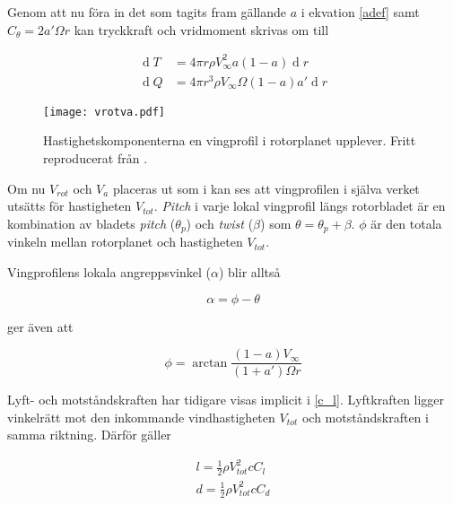 Genom att nu föra in det som tagits fram gällande $a$ i ekvation \ref{adef} samt $C_{\theta} = 2 a' \Omega r$ kan tryckkraft och vridmoment skrivas om till

\begin{equations}
\begin{align}
\label{firstdT}\operatorname{d}\!T &= 4 \pi r \rho V_{\infty}^2 a (1 - a) \operatorname{d}\!r \\
\label{firstdQ}\operatorname{d}\!Q &= 4 \pi r^3 \rho V_{\infty} \Omega (1 - a) a' \operatorname{d}\!r 
\end{align}
\end{equations}

\begin{figure}[!htb]
  \centering
  \texttt{[image: vrotva.pdf]}
  \caption{Hastighetskomponenterna en vingprofil i rotorplanet upplever. Fritt reproducerat från \citet{hansen}.}
  \label{vrotva}
\end{figure}

Om nu $V_{rot}$ och $V_a$ placeras ut som i  kan ses att vingprofilen i själva verket utsätts för hastigheten $V_{tot}$. \emph{Pitch} i varje lokal vingprofil längs rotorbladet är en kombination av bladets \emph{pitch} ($\theta_p$) och \emph{twist} ($\beta$) som $\theta = \theta_p + \beta$. $\phi$ är den totala vinkeln mellan rotorplanet och hastigheten $V_{tot}$.

Vingprofilens lokala angreppsvinkel ($\alpha$) blir alltså

\begin{equation*}
\alpha = \phi - \theta
\end{equation*}

 ger även att 

\begin{equation*}
\phi = \arctan \frac{(1 - a)V_{\infty}}{(1 + a')\Omega r}
\end{equation*}

Lyft- och motståndskraften har tidigare visas implicit i \ref{c_l}. Lyftkraften ligger vinkelrätt mot den inkommande vindhastigheten $V_{tot}$ och motståndskraften i samma riktning. Därför gäller

\begin{equations}
\begin{align}
    l = \frac{1}{2} \rho V_{tot}^2 c C_l \\
    d = \frac{1}{2} \rho V_{tot}^2 c C_d
\end{align}
\end{equations}

